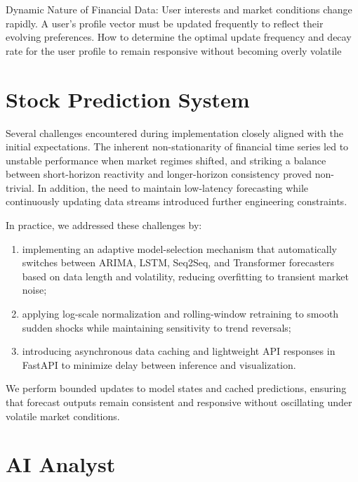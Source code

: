 Dynamic Nature of Financial Data: User interests and market conditions change rapidly. A user's profile vector must be updated frequently to reflect their evolving preferences. How to determine the optimal update frequency and decay rate for the user profile to remain responsive without becoming overly volatile

\section{Stock Prediction System}


Several challenges encountered during implementation closely aligned with the initial expectations.  
The inherent non-stationarity of financial time series led to unstable performance when market regimes shifted,  
and striking a balance between short-horizon reactivity and longer-horizon consistency proved non-trivial.  
In addition, the need to maintain low-latency forecasting while continuously updating data streams introduced further engineering constraints.   

In practice, we addressed these challenges by:
\begin{enumerate}
    \item implementing an adaptive model-selection mechanism that automatically switches between ARIMA, LSTM, Seq2Seq, and Transformer forecasters based on data length and volatility, reducing overfitting to transient market noise;
    \item applying log-scale normalization and rolling-window retraining to smooth sudden shocks while maintaining sensitivity to trend reversals;
    \item introducing asynchronous data caching and lightweight API responses in FastAPI to minimize delay between inference and visualization.
\end{enumerate}
We perform bounded updates to model states and cached predictions, 
ensuring that forecast outputs remain consistent and responsive without oscillating under volatile market conditions.



\section{AI Analyst}

